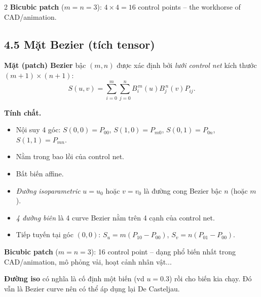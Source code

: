 \begin{paracol}{2}
\textbf{Bicubic patch} ($m=n=3$): $4\times 4=16$ control points -- the workhorse of CAD/animation.

\begin{center}
\end{center}

\switchcolumn

\subsection*{4.5 Mặt Bezier (tích tensor)}

\textbf{Mặt (patch) Bezier} bậc $(m,n)$ được xác định bởi \emph{lưới control net} kích thước $(m{+}1){\times}(n{+}1)$:
\[
S(u,v)=\sum_{i=0}^{m}\sum_{j=0}^{n}B_i^{\,m}(u)B_j^{\,n}(v)P_{ij}.
\]

\textbf{Tính chất.}
\begin{itemize}[leftmargin=*,nosep]
  \item Nội suy 4 góc: $S(0,0)=P_{00}$, $S(1,0)=P_{m0}$, $S(0,1)=P_{0n}$, $S(1,1)=P_{mn}$.
  \item Nằm trong bao lồi của control net.
  \item Bất biến affine.
  \item \emph{Đường isoparametric} $u=u_0$ hoặc $v=v_0$ là đường cong Bezier bậc $n$ (hoặc $m$).
  \item \emph{4 đường biên} là 4 curve Bezier nằm trên 4 cạnh của control net.
  \item Tiếp tuyến tại góc $(0,0)$: $S_u=m(P_{10}-P_{00})$, $S_v=n(P_{01}-P_{00})$.
\end{itemize}

\textbf{Bicubic patch} ($m=n=3$): 16 control point -- dạng phổ biến nhất trong CAD/animation, mô phỏng vải, hoạt cảnh nhân vật...

\medskip
\textbf{Đường iso} có nghĩa là cố định một biến (vd $u=0.3$) rồi cho biến kia chạy. Đó vẫn là Bezier curve nên có thể áp dụng lại De Casteljau.

\switchcolumn*


\end{paracol}
